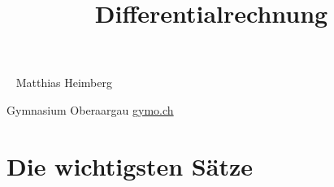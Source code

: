 \documentclass[justified,openany,nofonts]{tufte-book}
\title{Differentialrechnung}
\begin{document}
\maketitle



\begin{fullwidth}
~\vfill
\thispagestyle{empty}
\setlength{\parindent}{0pt}
\setlength{\parskip}{\baselineskip}
Matthias Heimberg

Gymnasium Oberaargau \url{gymo.ch}



\end{fullwidth}


\tableofcontents





\chapter*{Die wichtigsten Sätze}%







\setcounter{chapter}{-1}
\end{document}
